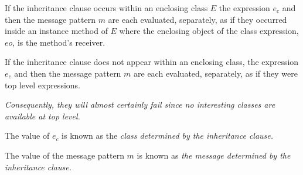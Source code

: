\documentclass{article}
\begin{document}
If the inheritance clause occurs within an enclosing class $E$
the expression $e_c$ and then the message pattern $m$ are each evaluated, separately, as if they occurred inside an instance method of $E$ where the enclosing object of the class expression, $eo$, is the method's receiver.   


If the inheritance clause does not appear within an enclosing class, 
the expression $e_c$ and then the message pattern $m$ are each evaluated, separately, as if they were top level expressions.

{\em 
Consequently, they will almost certainly fail since no interesting classes are available at top level.
}

The value of $e_c$ is known as the {\em class determined by the inheritance clause.}


The value of the message pattern $m$  is known as {\em the message determined by the inheritance clause.}

 


\end{document}
